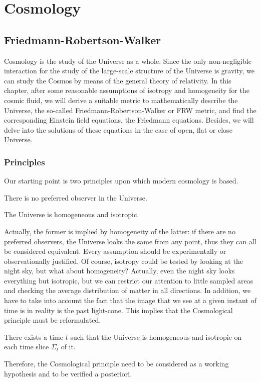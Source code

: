 \part{Cosmology}

\chapter{Friedmann-Robertson-Walker}

    Cosmology is the study of the Universe as a whole. Since the only non-negligible interaction for the study of the large-scale structure of the Universe is gravity, we can study the Cosmos by means of the general theory of relativity. In this chapter, after some reasonable assumptions of isotropy and homogeneity for the cosmic fluid, we will derive a suitable metric to mathematically describe the Universe, the so-called Friedmann-Robertson-Walker or FRW metric, and find the corresponding Einstein field equations, the Friedmann equations. Besides, we will delve into the solutions of these equations in the case of open, flat or close Universe.

\section{Principles}
    
    Our starting point is two principles upon which modern cosmology is based.
    \begin{princ}[Copernican]
        There is no preferred observer in the Universe.
    \end{princ}
    \begin{princ}[Cosmological]
        The Universe is homogeneous and isotropic.
    \end{princ}
    \noindent Actually, the former is implied by homogeneity of the latter: if there are no preferred observers, the Universe looks the same from any point, thus they can all be considered equivalent. Every assumption should be experimentally or observationally justified. Of course, isotropy could be tested by looking at the night sky, but what about homogeneity? Actually, even the night sky looks everything but isotropic, but we can restrict our attention to little sampled areas and checking the average distribution of matter in all directions. In addition, we have to take into account the fact that the image that we see at a given instant of time is in reality is the past light-cone. This implies that the Cosmological principle must be reformulated. 
    \begin{princ}[Cosmological II]
        There exists a time $t$ such that the Universe is homogeneous and isotropic on each time slice $\Sigma_t$ of it.
    \end{princ}
    \noindent Therefore, the Cosmological principle need to be considered as a working hypothesis and to be verified a posteriori.

